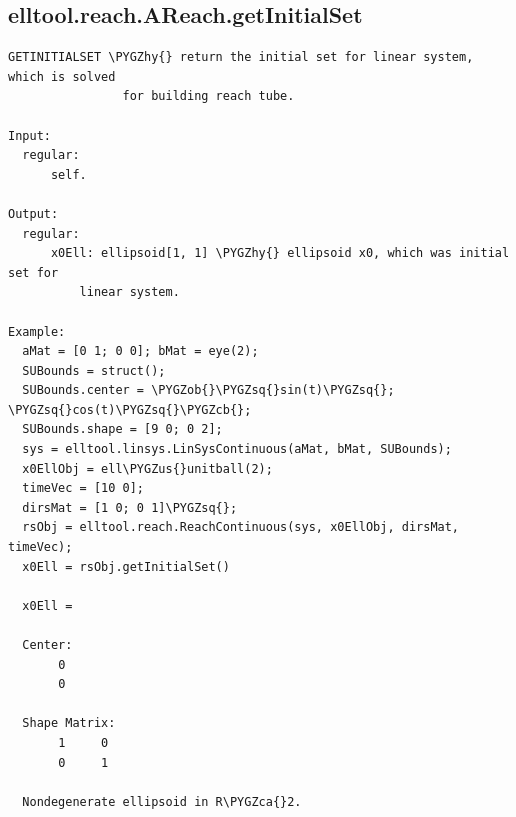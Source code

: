 \documentclass[letterpaper,10pt,english]{sphinxmanual}
\def\PYGZus{\char`\_}
\def\PYGZob{\char`\{}
\def\PYGZcb{\char`\}}
\def\PYGZca{\char`\^}
\def\PYGZhy{\char`\-}
\def\PYGZsq{\char`\'}
\begin{document}
\subsection{elltool.reach.AReach.getInitialSet}
\label{chap_functions:elltool-reach-areach-getinitialset}
\begin{Verbatim}[commandchars=\\\{\}]
GETINITIALSET \PYGZhy{} return the initial set for linear system, which is solved
                for building reach tube.

Input:
  regular:
      self.

Output:
  regular:
      x0Ell: ellipsoid[1, 1] \PYGZhy{} ellipsoid x0, which was initial set for
          linear system.

Example:
  aMat = [0 1; 0 0]; bMat = eye(2);
  SUBounds = struct();
  SUBounds.center = \PYGZob{}\PYGZsq{}sin(t)\PYGZsq{}; \PYGZsq{}cos(t)\PYGZsq{}\PYGZcb{};
  SUBounds.shape = [9 0; 0 2];
  sys = elltool.linsys.LinSysContinuous(aMat, bMat, SUBounds);
  x0EllObj = ell\PYGZus{}unitball(2);
  timeVec = [10 0];
  dirsMat = [1 0; 0 1]\PYGZsq{};
  rsObj = elltool.reach.ReachContinuous(sys, x0EllObj, dirsMat, timeVec);
  x0Ell = rsObj.getInitialSet()

  x0Ell =

  Center:
       0
       0

  Shape Matrix:
       1     0
       0     1

  Nondegenerate ellipsoid in R\PYGZca{}2.
\end{Verbatim}
\end{document}

